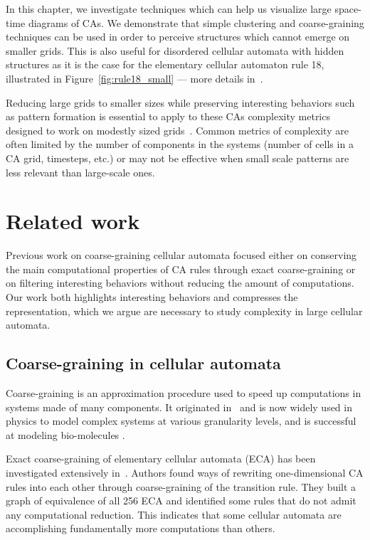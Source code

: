 In this chapter, we investigate techniques which can help us visualize large
space-time diagrams of CAs. We demonstrate that simple clustering and
coarse-graining techniques can be used in order to perceive structures which
cannot emerge on smaller grids. This is also useful for disordered cellular
automata with hidden structures as it is the case for the elementary cellular
automaton rule 18, illustrated in Figure~\ref{fig:rule18_small} --- more details
in~.

Reducing large grids to smaller sizes while preserving interesting behaviors
such as pattern formation is essential to apply to these CAs complexity metrics
designed to work on modestly sized
grids~\parencite{grassbergerQuantitativeTheorySelfgenerated1986,
  zenilCompressionBasedInvestigationDynamical2010,
  soler-toscanoCalculatingKolmogorovComplexity2014,
  zenilTwodimensionalKolmogorovComplexity2015}. Common metrics of complexity are
often limited by the number of components in the systems (number of cells in a
CA grid, timesteps, etc.) or may not be effective when small scale patterns are
less relevant than large-scale ones.

\section{Related work}

Previous work on coarse-graining cellular automata focused either on conserving
the main computational properties of CA rules through exact coarse-graining or
on filtering interesting behaviors without reducing the amount of computations.
Our work both highlights interesting behaviors and compresses the
representation, which we argue are necessary to study complexity in large
cellular automata.

\subsection{Coarse-graining in cellular automata}

Coarse-graining is an approximation procedure used to speed up computations in
systems made of many components. It originated
in~\parencite{levittComputerSimulationProtein1975} and is now widely used in physics
to model complex systems at various granularity levels, and is successful at
modeling bio-molecules \parencite{potoyanRecentSuccessesCoarsegrained2013,
  ingolfssonPowerCoarseGraining2014, kmiecikCoarseGrainedProteinModels2016}.

Exact coarse-graining of elementary cellular automata (ECA) has been
investigated extensively
in~\parencite{israeliComputationalIrreducibilityPredictability2004,
  israeliCoarsegrainingCellularAutomata2006}. Authors found ways of rewriting
one-dimensional CA rules into each other through coarse-graining of the
transition rule. They built a graph of equivalence of all 256 ECA and identified
some rules that do not admit any computational reduction. This indicates that
some cellular automata are accomplishing fundamentally more computations than
others.

